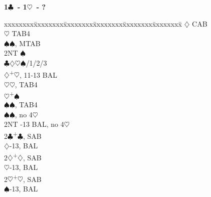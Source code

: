 \documentclass[10pt]{article}
\renewcommand{\c}{$\clubsuit$}
\renewcommand{\d}{$\diamondsuit$}
\newcommand{\h}{$\heartsuit$}
\newcommand{\s}{$\spadesuit$}
\newcommand{\p}{\textsuperscript{+}}
\newenvironment{bidtable}[1][]
{\textbf{#1}
  \begin{adjustwidth}{1em}{}
    \addvspace{2pt}
    \begin{tabbing}
      xxxxxxxx\=xxxxxxxx\=xxxxxxxx\=xxxxxxxx\=xxxxxxxx\=xxxxxxxx\=\kill}
{\end{tabbing}\end{adjustwidth}\bigskip}%
\begin{document}
\begin{multicols*}{2}
\begin{bidtable}[1\c\ - 1\h\ - ?]
    \>     \d  \> CAB                           \\
    \>     \h  \> TAB4                          \\
    \>     \s  {}\s, MTAB                     \\
    \>     \>      \> 2NT       \s              \\
    \>     \>      \c\d\h\s {}/1/2/3          \\
    \d {}\p\h, 11-13 BAL                      \\
    \>     \h  {}\h, TAB4                     \\
    \h {}\p\s                                 \\
    \>     \s  {}\s, TAB4                     \\
    \s {}\s, no 4\h                           \\
    \> 2NT -13 BAL, no 4\h                     \\
2\c {}\p\c, SAB                                        \\
    \d {}-13, BAL                            \\
2\d {}\p\d, SAB                                        \\
    \h {}-13, BAL                            \\
2\h {}\p\h, SAB                                        \\
    \s {}-13, BAL
\end{bidtable}


\end{multicols*}
\end{document}
